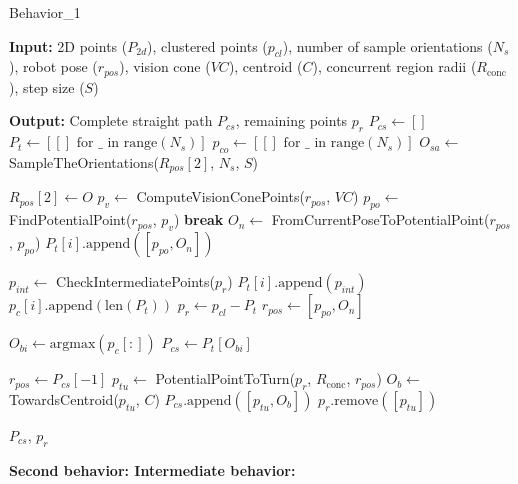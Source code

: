 \begin{algorithm}[H]
    \caption{Behavior\_1}
    \label{alg:behavioral1}
    \begin{algorithmic}[1]

    \Statex \textbf{Input:} 2D points ($P_{2d}$), clustered points ($p_{cl}$), number of sample orientations ($N_s$), robot pose ($r_{pos}$), vision cone ($VC$), centroid ($C$), concurrent region radii ($R_{\text{conc}}$), step size ($S$)

    \Statex \textbf{Output:} Complete straight path $P_{cs}$, remaining points $p_r$
    \newline
    \State $P_{cs} \leftarrow []$
    \State $P_t \leftarrow [[] \text{ for } \_ \text{ in range}(N_s)]$
    \State $p_{co} \leftarrow [[] \text{ for } \_ \text{ in range}(N_s)]$
    \State $O_{sa} \leftarrow$ SampleTheOrientations($R_{pos}[2]$, $N_s$, $S$)
    
        \State $R_{pos}[2] \leftarrow O$
            \State $p_v \leftarrow$ ComputeVisionConePoints($r_{pos}$, $VC$)
            \State $p_{po} \leftarrow$ FindPotentialPoint($r_{pos}$, $p_v$)
                \State \textbf{break}
            \EndIf
            \State $O_n \leftarrow$ FromCurrentPoseToPotentialPoint($r_{pos}$, $p_{po}$)
            \State $P_t[i].\text{append}([p_{po}, O_n])$
            
            \State $p_{int} \leftarrow$ CheckIntermediatePoints($p_r$)
            \State $P_t[i].\text{append}(p_{int})$
            \State $p_c[i].\text{append}(\text{len}(P_t))$
            \State $p_r \leftarrow p_{cl} - P_t$
            \State $r_{pos} \leftarrow [p_{po}, O_n]$
        \EndWhile
    \EndFor
    
    \State $O_{bi} \leftarrow \text{argmax}(p_c[:])$
    \State $P_{cs} \leftarrow P_t[O_{bi}]$
    
    \State $r_{pos} \leftarrow P_{cs}[-1]$
    \State $p_{tu} \leftarrow$ PotentialPointToTurn($p_r$, $R_{\text{conc}}$, $r_{pos}$)
    \State $O_b \leftarrow$ TowardsCentroid($p_{tu}$, $C$)
    \State $P_{cs}.\text{append}([p_{tu}, O_b])$
    \State $p_r.\text{remove}([p_{tu}])$
    
    \State \Return $P_{cs}$, $p_r$
    \end{algorithmic}
    \end{algorithm}
    


\textbf{Second behavior: Intermediate behavior:} 

